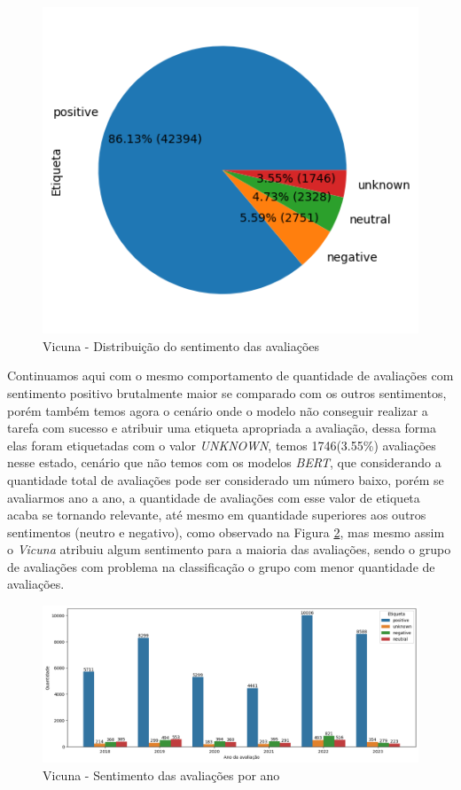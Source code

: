 \begin{figure}
	\centering
	\includegraphics{figs/vicuna/distribuicao_pizza.png}
	\caption{Vicuna - Distribuição do sentimento das avaliações}
	\label{img:vicuna_pizza_distribuicao}
\end{figure}

Continuamos aqui com o mesmo comportamento de quantidade de avaliações com sentimento positivo brutalmente maior se comparado com os outros sentimentos, porém também temos agora o cenário onde o modelo não conseguir realizar a tarefa com sucesso e atribuir uma etiqueta apropriada a avaliação, dessa forma elas foram etiquetadas com o valor \textit{UNKNOWN}, temos 1746(3.55\%) avaliações nesse estado, cenário que não temos com os modelos \textit{BERT}, que considerando a quantidade total de avaliações pode ser considerado um número baixo, porém se avaliarmos ano a ano, a quantidade de avaliações com esse valor de etiqueta acaba se tornando relevante, até mesmo em quantidade superiores aos outros sentimentos (neutro e negativo), como observado na Figura \ref{img:vicuna_sentimento_ano}, mas mesmo assim o \textit{Vicuna} atribuiu algum sentimento para a maioria das avaliações, sendo o grupo de avaliações com problema na classificação o grupo com menor quantidade de avaliações.

\begin{figure}
	\centering
	\includegraphics[width=1\textwidth]{figs/vicuna/sentimento_ano.png}
	\caption{Vicuna - Sentimento das avaliações por ano}
	\label{img:vicuna_sentimento_ano}
\end{figure}

